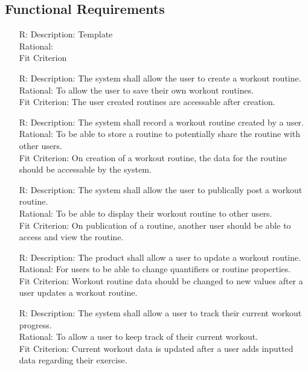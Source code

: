 \documentclass[12pt]{article}
\newcounter{reqnum} %
\begin{document}
	\subsection{Functional Requirements}
	\noindent \begin{itemize}
		
		\item[R\refstepcounter{reqnum}\thereqnum \label{R_Inputs}:]
		Description: Template
		\\ Rational:
		\\ Fit Criterion
		
		\item[R\refstepcounter{reqnum}\thereqnum \label{R_Inputs}:]
		Description: The system shall allow the user to create a workout routine.
		\\ Rational: To allow the user to save their own workout routines.
		\\ Fit Criterion: The user created routines are accessable after creation.
		
		\item[R\refstepcounter{reqnum}\thereqnum \label{R_Inputs}:]
		Description: The system shall record a workout routine created by a user. 
		\\ Rational: To be able to store a routine to potentially share the routine with
		other users.
		\\ Fit Criterion: On creation of a workout routine, the data for the routine
		should be accessable by the system.
		
		\item[R\refstepcounter{reqnum}\thereqnum \label{R_Inputs}:]
		Description: The system shall allow the user to publically post a workout
		routine.
		\\ Rational: To be able to display their workout routine to other users.
		\\ Fit Criterion: On publication of a routine, another user should be able to
		access and view the routine.
		
		\item[R\refstepcounter{reqnum}\thereqnum \label{R_Inputs}:]
		Description: The product shall allow a user to update a workout routine.
		\\ Rational: For users to be able to change quantifiers or routine properties.
		\\ Fit Criterion: Workout routine data should be changed to new values after a user updates a workout routine.
		
		\item[R\refstepcounter{reqnum}\thereqnum \label{R_Inputs}:]
		Description: The system shall allow a user to track their current workout progress.
		\\ Rational: To allow a user to keep track of their current workout.
		\\ Fit Criterion: Current workout data is updated after a user adds inputted data regarding their exercise.
		

\end{itemize}
\end{document}
